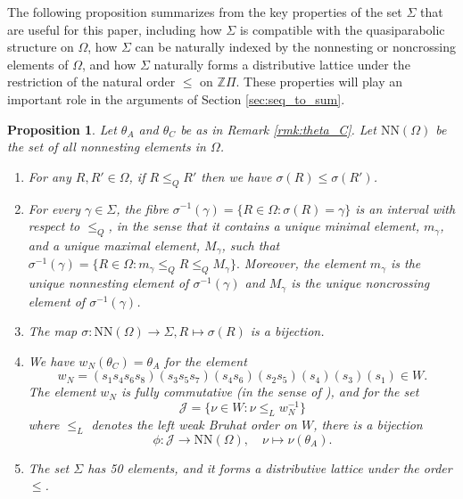 \documentclass[10pt,a4paper]{amsart}
\newtheorem{prop}[theorem]{Proposition}
\numberwithin{equation}{section}
\newcommand{\al}{\alpha}
\newcommand{\Z}{{\mathbb Z}}
\newcommand{\ra}{\rightarrow}
\newcommand{\wnn}{w_{N}}
\newcommand{\calj}{\mathcal{J}}
\newcommand{\ob}{\Omega}
\newcommand{\nn}{\mathrm{NN}}
\newcommand{\inverse}{^{-1}}
\begin{document}
The following proposition summarizes from \cite{gx5} the key properties of the
set $\Sigma$ that are useful for this paper, including how $\Sigma$ is compatible
with the quasiparabolic structure on $\ob$, how $\Sigma$ can be naturally
indexed by the nonnesting or noncrossing elements of $\ob$, and how $\Sigma$
naturally forms a distributive lattice under the restriction of the
natural order $\le$ on $\Z\Pi$. 
These properties will play an important
role in the arguments of Section \ref{sec:seq_to_sum}.



\begin{prop}
\label{prop:Sigma}
Let $\theta_A$ and $\theta_C$ be as in Remark \ref{rmk:theta_C}. Let
$\nn(\ob)$ be the set of all nonnesting elements in $\ob$.
\begin{enumerate} 
\item For any $R,R'\in \ob$, if $R\le_Q R'$ then we have $\sigma(R)\le
  \sigma(R')$.

\item For every $\gamma\in \Sigma$, the fibre $\sigma\inverse(\gamma)=\{R\in
  \ob:\sigma(R)=\gamma\}$ is an interval with respect to $\le_Q$, in the sense
  that it contains a unique minimal element, $m_\gamma$, and a unique maximal
  element, $M_\gamma$, such that $ \sigma\inverse(\gamma)=\{R\in
  \ob:m_\gamma\le_Q R\le_Q M_\gamma\}. $ Moreover, the element $m_\gamma$ is the
  unique nonnesting element of $\sigma\inverse(\gamma)$ and $M_\gamma$ is the
  unique noncrossing element of $\sigma\inverse(\gamma)$.

\item The map $\sigma:\nn(\ob)\ra\Sigma, R\mapsto \sigma(R)$ is a bijection.


\item We have $\wnn(\theta_C)=\theta_A$ for the element
  \begin{equation}\label{eq:w}
    \wnn=(s_1s_4s_6s_8)(s_3s_5s_7)(s_4s_6)(s_2s_5)(s_4)(s_3)(s_1)\in W. 
  \end{equation}
The element $\wnn$ is fully commutative \textup{(}in the sense of \cite{FC}\textup{)}, and for the set 
 \[
    \mathcal{J}=\{\nu\in W:\nu\le_L \wnn\inverse \} 
  \]
where $\le_L$ denotes the left weak Bruhat order on $W$, there is
  a bijection   
  \begin{equation}\label{eq:elt_to_sum} 
    \phi: \calj \ra \nn(\ob), \quad \nu\mapsto  \nu(\theta_A).
  \end{equation}
\item The set $\Sigma$ has 50 elements, and it forms a
  distributive lattice under the order $\le$.
%  
\end{enumerate}
\end{prop}
\end{document}
